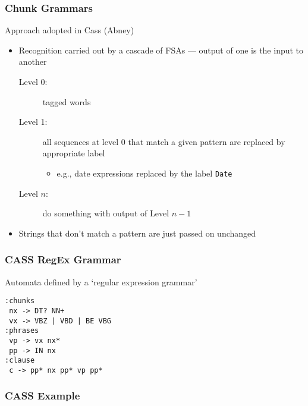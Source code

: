 \begin{frame}[fragile]
  \frametitle{Chunk Grammars}

Approach adopted in Cass (Abney)
\begin{itemize}
  \item Recognition carried out by a cascade of FSAs --- output of one is
    the input to another
    \begin{description}
      \item [Level 0:] tagged words
      \item [Level 1:] all sequences at level 0 that match a given
        pattern are replaced by appropriate label
        \begin{itemize}
          \item e.g., date expressions replaced by the label \texttt{Date}
        \end{itemize}
      \item [Level $n$:] do something with output of Level $n-1$
    \end{description}
  \item Strings that don't match a pattern are just passed on unchanged
\end{itemize}

\end{frame}

\begin{frame}[fragile]
  \frametitle{CASS RegEx Grammar}

Automata defined by a `regular expression grammar'
\begin{verbatim}
:chunks
 nx -> DT? NN+
 vx -> VBZ | VBD | BE VBG
:phrases
 vp -> vx nx*
 pp -> IN nx
:clause
 c -> pp* nx pp* vp pp*
\end{verbatim}

\end{frame}

\begin{frame}[fragile]
  \frametitle{CASS Example}

{\small
\begin{semiverbatim}



\uncover<4->{[c [vx take/VBP] [nx the/DT road/NN] [pp on/IN [nx the/DT left/NN]]}
\end{semiverbatim}
}

\end{frame}



